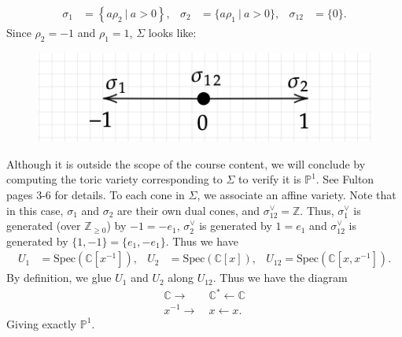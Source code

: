 \documentclass{article}
\theoremstyle{definition}
\theoremstyle{remark}
\numberwithin{theorem}{section}
\newcommand{\C}{\mathbb{C}}
\newcommand{\Z}{\mathbb{Z}}
\newcommand{\bP}{\mathbb{P}}
\newcommand{\Spec}{\text{Spec}}
\begin{document}
	\begin{align*}
	\sigma_1 &= \left\{ a \rho_2 ~|~ a>0 \right\}, & \sigma_2 &= \{ a\rho_1 ~|~ a>0 \}, & \sigma_{12} &= \{0\}.
	\end{align*}
	Since $\rho_2=-1$ and $\rho_1 =1$, $\Sigma$ looks like: 
	\begin{figure}[h]
		\centering
		\includegraphics[width=0.8\linewidth]{p1fan.png}
	\end{figure}
	\vspace{1em}

	Although it is outside the scope of the course content, we will conclude by computing the toric variety corresponding to $\Sigma$ to verify it is $\bP^1$. See Fulton pages 3-6 for details. To each cone in $\Sigma$, we associate an affine variety. Note that in this case, $\sigma_1$ and $\sigma_2$ are their own dual cones, and $\sigma_{12}^\vee = \Z$. Thus, $\sigma_1^\vee$ is generated (over $\Z_{\geq 0}$) by $-1=-e_1$, $\sigma_2^\vee$ is generated by $1=e_1$ and $\sigma_{12}^\vee$ is generated by $\{1,-1\} =\{e_1,-e_1\}$. Thus we have
	\begin{align*}
		U_1 &= \Spec(\C[x^{-1}]), & U_2 &= \Spec(\C[x]), & U_{12} = \Spec(\C[x,x^{-1}]).
	\end{align*}
	By definition, we glue $U_1$ and $U_2$ along $U_{12}$. Thus we have the diagram
	\begin{align*}
		\C \rightarrow &~\C^\ast \leftarrow \C\\
		x^{-1} \rightarrow &~x \leftarrow x.
	\end{align*}
	Giving exactly $\bP^1$.
\end{document}
